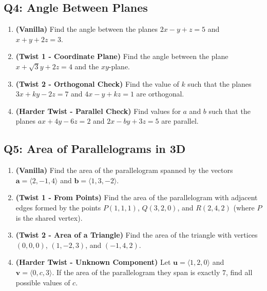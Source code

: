 \documentclass[11pt]{article}
\begin{document}
\subsection{Q4: Angle Between Planes}
\begin{enumerate}[label=\textbf{4\alph*.}]
    \item \textbf{(Vanilla)} Find the angle between the planes $2x - y + z = 5$ and $x + y + 2z = 3$.
    \item \textbf{(Twist 1 - Coordinate Plane)} Find the angle between the plane $x + \sqrt{3}y + 2z = 4$ and the $xy$-plane.
    \item \textbf{(Twist 2 - Orthogonal Check)} Find the value of $k$ such that the planes $3x + ky - 2z = 7$ and $4x - y + kz = 1$ are orthogonal.
    \item \textbf{(Harder Twist - Parallel Check)} Find values for $a$ and $b$ such that the planes $ax + 4y - 6z = 2$ and $2x - by + 3z = 5$ are parallel.
\end{enumerate}

\subsection{Q5: Area of Parallelograms in 3D}
\begin{enumerate}[label=\textbf{5\alph*.}]
    \item \textbf{(Vanilla)} Find the area of the parallelogram spanned by the vectors $\mathbf{a} = \langle 2, -1, 4 \rangle$ and $\mathbf{b} = \langle 1, 3, -2 \rangle$.
    \item \textbf{(Twist 1 - From Points)} Find the area of the parallelogram with adjacent edges formed by the points $P(1, 1, 1)$, $Q(3, 2, 0)$, and $R(2, 4, 2)$ (where $P$ is the shared vertex).
    \item \textbf{(Twist 2 - Area of a Triangle)} Find the area of the triangle with vertices $(0, 0, 0)$, $(1, -2, 3)$, and $(-1, 4, 2)$.
    \item \textbf{(Harder Twist - Unknown Component)} Let $\mathbf{u} = \langle 1, 2, 0 \rangle$ and $\mathbf{v} = \langle 0, c, 3 \rangle$. If the area of the parallelogram they span is exactly $7$, find all possible values of $c$.
\end{enumerate}
\end{document}

